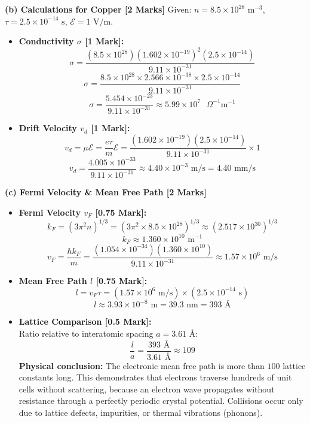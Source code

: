 \documentclass[10pt,a4paper,twocolumn]{article}
\begin{document}
\textbf{(b) Calculations for Copper [2 Marks]}
Given: $n = 8.5 \times 10^{28}\text{ m}^{-3}$, $\tau = 2.5 \times 10^{-14}\text{ s}$, $\mathcal{E} = 1\text{ V/m}$.
\begin{itemize}
    \item \textbf{Conductivity $\sigma$ [1 Mark]:}
    $$\sigma = \frac{(8.5 \times 10^{28})(1.602 \times 10^{-19})^2 (2.5 \times 10^{-14})}{9.11 \times 10^{-31}}$$
    $$\sigma = \frac{8.5 \times 10^{28} \times 2.566 \times 10^{-38} \times 2.5 \times 10^{-14}}{9.11 \times 10^{-31}}$$
    $$\sigma = \frac{5.454 \times 10^{-23}}{9.11 \times 10^{-31}} \approx 5.99 \times 10^7\text{ }\Omega^{-1}\text{m}^{-1}$$
    \item \textbf{Drift Velocity $v_d$ [1 Mark]:}
    $$v_d = \mu \mathcal{E} = \frac{e\tau}{m}\mathcal{E} = \frac{(1.602 \times 10^{-19})(2.5 \times 10^{-14})}{9.11 \times 10^{-31}} \times 1$$
    $$v_d = \frac{4.005 \times 10^{-33}}{9.11 \times 10^{-31}} \approx 4.40 \times 10^{-3}\text{ m/s} = 4.40\text{ mm/s}$$
\end{itemize}

\textbf{(c) Fermi Velocity \& Mean Free Path [2 Marks]}
\begin{itemize}
    \item \textbf{Fermi Velocity $v_F$ [0.75 Mark]:}
    $$k_F = (3\pi^2 n)^{1/3} = (3\pi^2 \times 8.5 \times 10^{28})^{1/3} \approx (2.517 \times 10^{30})^{1/3}$$
    $$k_F \approx 1.360 \times 10^{10}\text{ m}^{-1}$$
    $$v_F = \frac{\hbar k_F}{m} = \frac{(1.054 \times 10^{-34})(1.360 \times 10^{10})}{9.11 \times 10^{-31}} \approx 1.57 \times 10^6\text{ m/s}$$
    \item \textbf{Mean Free Path $l$ [0.75 Mark]:}
    $$l = v_F \tau = (1.57 \times 10^6\text{ m/s}) \times (2.5 \times 10^{-14}\text{ s})$$
    $$l \approx 3.93 \times 10^{-8}\text{ m} = 39.3\text{ nm} = 393\text{ \AA}$$
    \item \textbf{Lattice Comparison [0.5 Mark]:}\\
    Ratio relative to interatomic spacing $a = 3.61\text{ \AA}$:
    $$\frac{l}{a} = \frac{393\text{ \AA}}{3.61\text{ \AA}} \approx 109$$
    \textbf{Physical conclusion:} The electronic mean free path is more than $100$ lattice constants long. This demonstrates that electrons traverse hundreds of unit cells without scattering, because an electron wave propagates without resistance through a perfectly periodic crystal potential. Collisions occur only due to lattice defects, impurities, or thermal vibrations (phonons).
\end{itemize}
\end{document}
